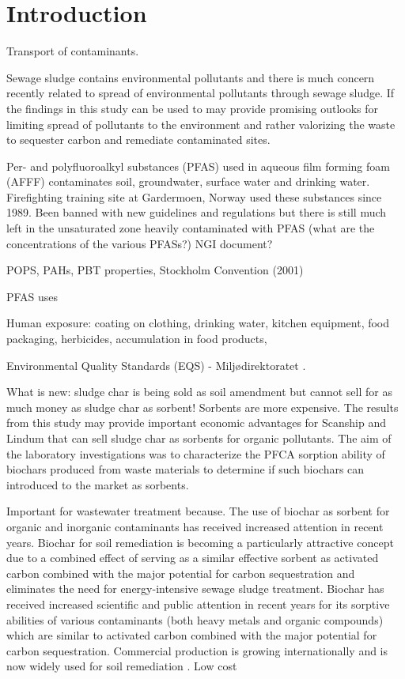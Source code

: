 \chapter{Introduction}\label{chap:intro}

Transport of contaminants.

Sewage sludge contains environmental pollutants and there is much concern recently related to spread of environmental pollutants through sewage sludge. If the findings in this study can be used to may provide promising outlooks for limiting spread of pollutants to the environment and rather valorizing the waste to sequester carbon and remediate contaminated sites.

Per- and polyfluoroalkyl substances (PFAS) used in aqueous film forming foam (AFFF) contaminates soil, groundwater, surface water and drinking water. Firefighting training site at Gardermoen, Norway used these substances since 1989. Been banned with new guidelines and regulations but there is still much left in the unsaturated zone heavily contaminated with PFAS (what are the concentrations of the various PFASs?) NGI document? 

POPS, PAHs, PBT properties, Stockholm Convention (2001)

PFAS uses

Human exposure: coating on clothing, drinking water, kitchen equipment, food packaging, herbicides, accumulation in food products, 

Environmental Quality Standards (EQS) - Miljødirektoratet \citep{EC2020PFAS}. \citep{MD2016workshop} \citep{MD2020EQS}

What is new: sludge char is being sold as soil amendment but cannot sell for as much money as sludge char as sorbent! Sorbents are more expensive. The results from this study may provide important economic advantages for Scanship and Lindum that can sell sludge char as sorbents for organic pollutants. The aim of the laboratory investigations was to characterize the PFCA sorption ability of biochars produced from waste materials to determine if such biochars can introduced to the market as sorbents. 

Important for wastewater treatment because. The use of biochar as sorbent for organic and inorganic contaminants has received increased attention in recent years. Biochar for soil remediation is becoming a particularly attractive concept due to a combined effect of serving as a similar effective sorbent as activated carbon combined with the major potential for carbon sequestration and eliminates the need for energy-intensive sewage sludge treatment. Biochar has received increased scientific and public attention in recent years for its sorptive abilities of various contaminants (both heavy metals and organic compounds) which are similar to activated carbon combined with the major potential for carbon sequestration. Commercial production is growing internationally and is now widely used for soil remediation \citep{Ahmad2014}. Low cost

